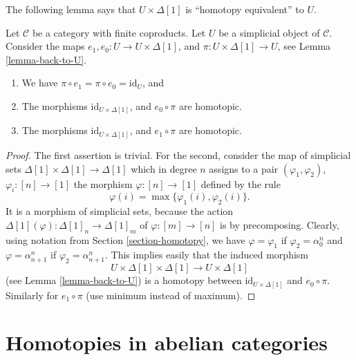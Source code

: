 \noindent
The following lemma says that $U \times \Delta[1]$
is ``homotopy equivalent'' to $U$.

\begin{lemma}
\label{lemma-contractible}
Let $\mathcal{C}$ be a category with finite coproducts.
Let $U$ be a simplicial object of $\mathcal{C}$.
Consider the maps $e_1, e_0 : U \to U\times \Delta[1]$,
and $\pi : U\times \Delta[1] \to U$, see
Lemma \ref{lemma-back-to-U}. 
\begin{enumerate}
\item We have $\pi \circ e_1 = \pi \circ e_0 = \text{id}_U$, and
\item The morphisms $\text{id}_{U \times \Delta[1]}$,
and $e_0 \circ \pi$ are homotopic.
\item The morphisms $\text{id}_{U \times \Delta[1]}$,
and $e_1 \circ \pi$ are homotopic.
\end{enumerate}
\end{lemma}

\begin{proof}
The first assertion is trivial.
For the second, consider the map
of simplicial sets
$\Delta[1] \times \Delta[1] \longrightarrow \Delta[1]$
which in degree $n$ assigns to a pair $(\varphi_1, \varphi_2)$,
$\varphi_i : [n] \to [1]$ the morphism
$\varphi : [n] \to [1]$ defined by the rule
$$
\varphi(i) = \max\{\varphi_1(i), \varphi_2(i)\}.
$$
It is a morphism of simplicial sets, because the action
$\Delta[1](\varphi) : \Delta[1]_n \to \Delta[1]_m$
of $\varphi : [m] \to [n]$ is by precomposing.
Clearly, using notation from Section \ref{section-homotopy},
we have $\varphi = \varphi_1$ if $\varphi_2 = \alpha^n_0$
and $\varphi = \alpha^n_{n + 1}$ if $\varphi_2 = \alpha^n_{n + 1}$.
This implies easily that the induced morphism
$$
U \times \Delta[1] \times \Delta[1]
\longrightarrow
U \times \Delta[1]
$$
(see Lemma \ref{lemma-back-to-U})
is a homotopy between $\text{id}_{U \times \Delta[1]}$ and $e_0 \circ \pi$.
Similarly for $e_1 \circ \pi$ (use minimum instead of maximum).
\end{proof}


\section{Homotopies in abelian categories}
\label{section-homotopy-abelian}

